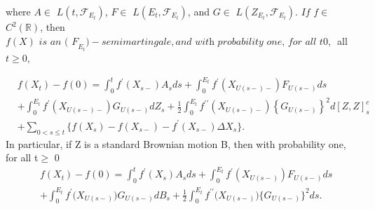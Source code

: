 \documentclass[12pt,final]{article}
\numberwithin{equation}{section}
\numberwithin{figure}{section}
\numberwithin{table}{section}
\theoremstyle{plain}
\theoremstyle{definition}
\theoremstyle{remark}
\begin{document}
where $A\in$ $L( t, \mathcal{F} _{E_t})$, $F\in$ $L( E_t, \mathcal{F} _{E_t})$, and $G\in$ $L( Z_{E_t}, \mathcal{F} _{E_t}) .$ $If$ $f\in$ $C^2( \mathbb{R} )$, then
$f( X) \textit{ is an ( F}_{E_t}) - semimartingale, and\textit{ with probability one,  for all t0, }$
all $t\geqslant 0$, 

$$\begin{aligned}
	&f(X_{t})-f(0)=\int_{0}^{t}f^{\prime}(X_{s-})A_{s}ds+\int_{0}^{E_{t}}f^{\prime}(X_{U(s-)-})F_{U(s-)}ds\\
	&+\int_0^{E_t}f^{\prime}(X_{U(s-)-})G_{U(s-)}dZ_s+\frac12\int_0^{E_t}f^{\prime\prime}(X_{U(s-)-})\left\{G_{U(s-)}\right\}^2d[Z,Z]_s^c\\
	&+\sum_{0<s\leqslant t}\{f(X_s)-f(X_{s-})-f^{\prime}(X_{s-})\Delta X_s\}.
\end{aligned}$$
In particular, if Z is a standard Brownian motion B, then with probability one, for all t$\geq$ 0
$$\begin{aligned}
	&f(X_{t})-f(0)=\int_{0}^{t}f^{\prime}(X_{s})A_{s}ds+\int_{0}^{E_{t}}f^{\prime}\left(X_{U(s-)}\right)F_{U(s-)}ds\\
	&+\int_{0}^{E_{t}}f^{\prime}\big(X_{U(s-)}\big)G_{U(s-)}dB_{s}+\frac{1}{2}\int_{0}^{E_{t}}f^{\prime\prime}\big(X_{U(s-)}\big)\big\{G_{U(s-)}\big\}^{2}ds.
\end{aligned}$$




\end{document}
